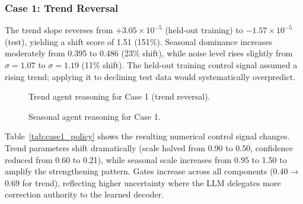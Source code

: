 \subsubsection{Case 1: Trend Reversal}

The trend slope reverses from $+3.05 \times 10^{-5}$ (held-out training) to $-1.57 \times 10^{-5}$ (test), yielding a shift score of 1.51 (151\%). Seasonal dominance increases moderately from 0.395 to 0.486 (23\% shift), while noise level rises slightly from $\sigma=1.07$ to $\sigma=1.19$ (11\% shift). The held-out training control signal assumed a rising trend; applying it to declining test data would systematically overpredict.

\begin{figure}[h!]
\centering
{}
\caption{Trend agent reasoning for Case 1 (trend reversal).}
\label{fig:case1_trend}
\end{figure}

\begin{figure}[h!]
\centering
{}
\caption{Seasonal agent reasoning for Case 1.}
\label{fig:case1_seasonal}
\end{figure}

Table~\ref{tab:case1_policy} shows the resulting numerical control signal changes. Trend parameters shift dramatically (scale halved from 0.90 to 0.50, confidence reduced from 0.60 to 0.21), while seasonal scale increases from 0.95 to 1.50 to amplify the strengthening pattern. Gates increase across all components (0.40$\rightarrow$0.69 for trend), reflecting higher uncertainty where the LLM delegates more correction authority to the learned decoder.

